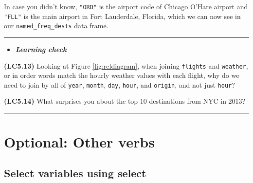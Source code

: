 \documentclass[]{tufte-book}
\newenvironment{Shaded}{\begin{snugshade}}{\end{snugshade}}
\newcommand{\KeywordTok}[1]{\textcolor[rgb]{0.13,0.29,0.53}{\textbf{{#1}}}}
\newcommand{\DataTypeTok}[1]{\textcolor[rgb]{0.13,0.29,0.53}{{#1}}}
\newcommand{\StringTok}[1]{\textcolor[rgb]{0.31,0.60,0.02}{{#1}}}
\newcommand{\NormalTok}[1]{{#1}}
\let\oldrule=\rule
\renewcommand{\rule}[1]{\oldrule{\linewidth}}
\newenvironment{rmdblock}[1]
  {\begin{shaded*}
  \begin{itemize}
  \renewcommand{\labelitemi}{
    \raisebox{-.7\height}[0pt][0pt]{
    }
  }
  \item
  }
  {
  \end{itemize}
  \end{shaded*}
  }
\newenvironment{learncheck}
  {\begin{rmdblock}{warning}}
  {\end{rmdblock}}
\begin{document}
\begin{Shaded}
\end{Shaded}

In case you didn't know, \texttt{"ORD"} is the airport code of Chicago
O'Hare airport and \texttt{"FLL"} is the main airport in Fort
Lauderdale, Florida, which we can now see in our
\texttt{named\_freq\_dests} data frame.

\begin{center}\rule{0.5\linewidth}{\linethickness}\end{center}

\begin{learncheck}
\textbf{\emph{Learning check}}
\end{learncheck}

\textbf{(LC5.13)} Looking at Figure \ref{fig:reldiagram}, when joining
\texttt{flights} and \texttt{weather}, or in order words match the
hourly weather values with each flight, why do we need to join by all of
\texttt{year}, \texttt{month}, \texttt{day}, \texttt{hour}, and
\texttt{origin}, and not just \texttt{hour}?

\textbf{(LC5.14)} What surprises you about the top 10 destinations from
NYC in 2013?

\begin{center}\rule{0.5\linewidth}{\linethickness}\end{center}

\section{Optional: Other verbs}\label{optional-other-verbs}

\subsection{Select variables using select}\label{select}
\end{document}
